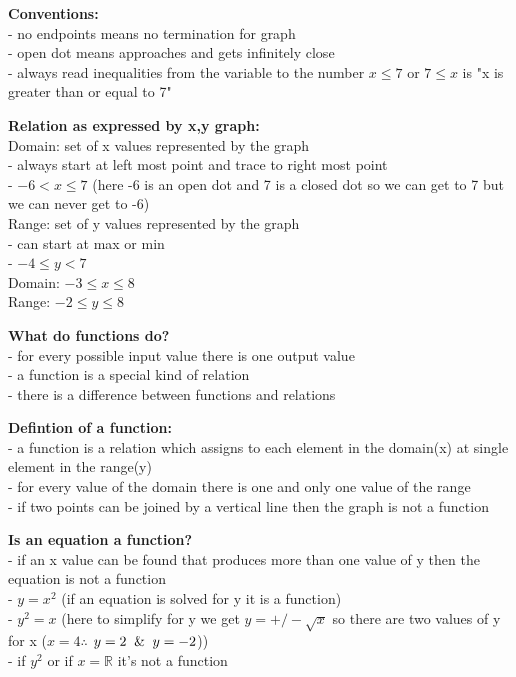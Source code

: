\documentclass[10pt]{article}
\begin{document}
\textbf{Conventions:} \\
- no endpoints means no termination for graph \\
- open dot means approaches and gets infinitely close \\
- always read inequalities from the variable to the number \(x \leq 7\) or \(7 \leq x\) is "x is greater than or equal to 7"


\textbf{Relation as expressed by x,y graph:} \\
Domain: set of x values represented by the graph \\
- always start at left most point and trace to right most point \\
- \(-6 < x \leq 7\) (here -6 is an open dot and 7 is a closed dot so we can get to 7 but we can never get to -6) \\
Range: set of y values represented by the graph \\
- can start at max or min \\
-  \(- 4 \leq y < 7\) \\
Domain: \(-3 \leq x \leq 8\) \\
Range: \(-2 \leq y \leq 8\)


\textbf{What do functions do?} \\
- for every possible input value there is one output value \\
- a function is a special kind of relation \\
- there is a difference between functions and relations


\textbf{Defintion of a function:} \\
- a function is a relation which assigns to each element in the domain(x) at single element in the range(y) \\
- for every value of the domain there is one and only one value of the range \\
- if two points can be joined by a vertical line then the graph is not a function

\textbf{Is an equation a function?} \\
- if an x value can be found that produces more than one value of y then the equation is not a function \\
- \(y = x^2\) (if an equation is solved for y it is a function) \\
- \(y^2 = x\) (here to simplify for y we get \(y = +/- \sqrt{x}\) so there are two values of y for x (\(x = 4 \therefore \) \(y = 2 \And y = -2\))) \\
- if \(y^2\) or if \(x = \mathbb{R} \)  it's not a function
\end{document}
